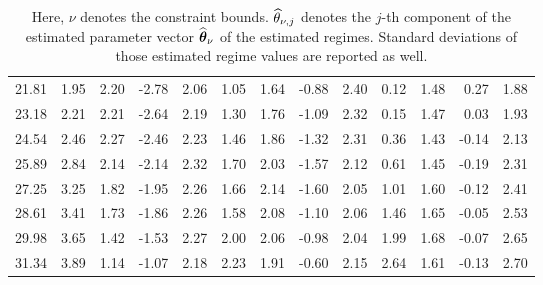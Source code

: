 \begin{table}[!htbp]
\begin{tabular}{rrrrrrrrrrrrr}
	21.81 &     1.95 &     2.20 &    -2.78 &     2.06  &     1.05 &     1.64 &    -0.88 &     2.40 &     0.12 &     1.48  &     0.27 &     1.88 \\ 
	23.18 &     2.21 &     2.21 &    -2.64 &     2.19  &     1.30 &     1.76 &    -1.09 &     2.32 &     0.15 &     1.47  &     0.03 &     1.93 \\ 
	24.54 &     2.46 &     2.27 &    -2.46 &     2.23  &     1.46 &     1.86 &    -1.32 &     2.31 &     0.36 &     1.43  &    -0.14 &     2.13 \\ 
	25.89 &     2.84 &     2.14 &    -2.14 &     2.32  &     1.70 &     2.03 &    -1.57 &     2.12 &     0.61 &     1.45  &    -0.19 &     2.31 \\ 
	27.25 &     3.25 &     1.82 &    -1.95 &     2.26  &     1.66 &     2.14 &    -1.60 &     2.05 &     1.01 &     1.60  &    -0.12 &     2.41 \\ 
	28.61 &     3.41 &     1.73 &    -1.86 &     2.26  &     1.58 &     2.08 &    -1.10 &     2.06 &     1.46 &     1.65  &    -0.05 &     2.53 \\ 
	29.98 &     3.65 &     1.42 &    -1.53 &     2.27  &     2.00 &     2.06 &    -0.98 &     2.04 &     1.99 &     1.68  &    -0.07 &     2.65 \\ 
	31.34 &     3.89 &     1.14 &    -1.07 &     2.18  &     2.23 &     1.91 &    -0.60 &     2.15 &     2.64 &     1.61  &    -0.13 &     2.70 \\ \hline 
\end{tabular}
\caption*{ Here, $\nu$ denotes the constraint bounds. $\widehat{\theta}_{\nu,j}$ denotes the $j$-th component of the estimated parameter vector $\widehat{\boldsymbol{\theta}}_{\nu}$ of the estimated regimes. Standard deviations of those estimated regime values are reported as well.}
\end{table} 
